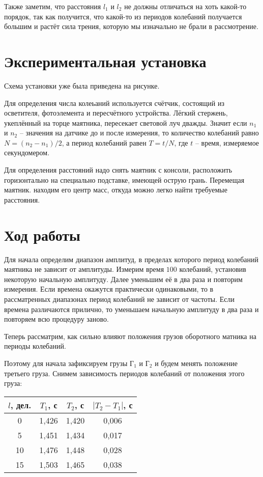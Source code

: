 \documentclass[a4paper, 12pt]{article} %
\begin{document}
Также заметим, что расстояния $l_1$ и $l_2$ не должны отличаться на хоть какой-то порядок, так как получится, что какой-то из периодов колебаний получается большим и растёт сила трения, которую мы изначально не брали в рассмотрение.
\newpage

\section{Экспериментальная установка}

Схема установки уже была приведена на рисунке. 

Для определения числа колеьаний используется счётчик, состоящий из осветителя, фотоэлемента и пересчётного устройства. Лёгкий стержень, укеплённый на торце маятника, пересекает световой луч дважды. Значит если $n_1$ и $n_2$ -- значения на датчике до и после измерения, то количество колебаний равно $N = (n_2 - n_1)/2$, а период колебаний равен $T = t/N$, где $t$ -- время, измеряемое секундомером.

Для определения расстояний надо снять маятник с консоли, расположить горизонтально на специально подставке, имеющей острую грань. Перемещая маятник. находим его центр масс, откуда можно легко найти требуемые расстояния.\\

\section{Ход работы}

Для начала определим диапазон амплитуд, в пределах которого период колебаний маятника не зависит от амплитуды. Измерим время $100$ колебаний, установив некоторую начальную амплитуду. Далее уменьшим её в два раза и повторим измерения. Если времена окажутся практически одинаковыми, то в рассматренных диапазонах период колебаний не зависит от частоты. Если времена различаются прилично, то уменьшаем начальную амплитуду в два раза и повторяем всю процедуру заново.

Теперь рассматрим, как сильно влияют положения грузов оборотного матника на периоды колебаний. 

Поэтому для начала зафиксируем грузы $\text{Г}_1$ и $\text{Г}_2$ и будем менять положение третьего груза. Снимем зависимость периодов колебаний от положения этого груза:
\begin{center}
\begin{tabular}{|c|c|c|c|}
\hline 
$l$, дел. & $T_1$, с & $T_2$, с & $|T_2 - T_1|$, с \\ 
\hline 
0 & 1,426 & 1,420& 0,006 \\ 
\hline 
5 & 1,451 & 1,434& 0,017 \\ 
\hline 
10 & 1,476 & 1,448& 0,028 \\ 
\hline 
15 & 1,503 & 1,465& 0,038 \\ 
\hline 
\end{tabular}
\end{center} 
\end{document}
